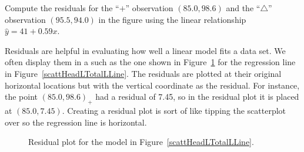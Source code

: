 \begin{exercisewrap}
\begin{nexercise}
Compute the residuals for the ``$+$'' observation $(85.0, 98.6)$
and the ``$\triangle$'' observation $(95.5, 94.0)$ in the figure
using the linear relationship $\hat{y} = 41 + 0.59x$.\footnotemark{}
\end{nexercise}
\end{exercisewrap}

Residuals are helpful in evaluating how well a linear model
fits a data set.
We often display them in a  such as the
one shown in Figure~\ref{scattHeadLTotalLResidualPlot}
for the regression line in Figure~\ref{scattHeadLTotalLLine}.
The residuals are plotted at their original horizontal locations
but with the vertical coordinate as the residual.
For instance, the point $(85.0,98.6)_{+}$ had a residual
of 7.45, so in the residual plot it is placed at $(85.0, 7.45)$.
Creating a residual plot is sort of like tipping the
scatterplot over so the regression line is horizontal. 

\begin{figure}[h]
  \centering
  \caption{Residual plot for the model in
      Figure~\ref{scattHeadLTotalLLine}.}
  \label{scattHeadLTotalLResidualPlot}
\end{figure}

